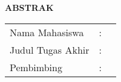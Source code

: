 \thispagestyle{newchap}
\begin{center}
  \large\textbf{ABSTRAK}
\end{center}


\vspace{2ex}

\begingroup
\setlength{\tabcolsep}{0pt}

\noindent
\begin{tabularx}{\textwidth}{l >{\centering}m{2em} X}
  Nama Mahasiswa    & : & \name{}         \\

  Judul Tugas Akhir & : & \tatitle{}      \\

  Pembimbing        & : & \advisor{}   \\
  
\end{tabularx}
\endgroup

